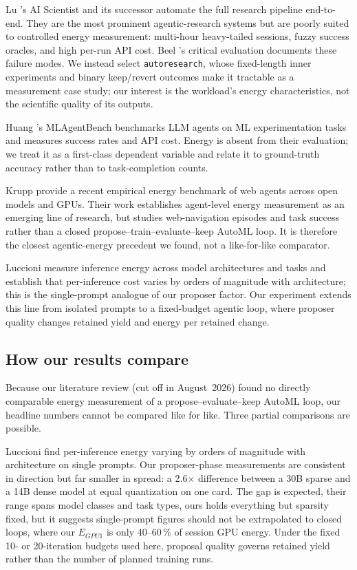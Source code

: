 Lu \etal's AI Scientist \cite{lu2024aiscientist} and its successor \cite{yamada2025aiscientist2} automate the full research pipeline end-to-end. They are the most prominent agentic-research systems but are poorly suited to controlled energy measurement: multi-hour heavy-tailed sessions, fuzzy success oracles, and high per-run API cost. Beel \etal's critical evaluation \cite{beel2025evaluating} documents these failure modes. We instead select \texttt{autoresearch}, whose fixed-length inner experiments and binary keep/revert outcomes make it tractable as a measurement case study; our interest is the workload's energy characteristics, not the scientific quality of its outputs.

Huang \etal's MLAgentBench \cite{huang2024mlagentbench} benchmarks LLM agents on ML experimentation tasks and measures success rates and API cost. Energy is absent from their evaluation; we treat it as a first-class dependent variable and relate it to ground-truth accuracy rather than to task-completion counts.

Krupp \etal \cite{krupp2026webagents} provide a recent empirical energy benchmark of web agents across open models and GPUs. Their work establishes agent-level energy measurement as an emerging line of research, but studies web-navigation episodes and task success rather than a closed propose--train--evaluate--keep AutoML loop. It is therefore the closest agentic-energy precedent we found, not a like-for-like comparator.

Luccioni \etal \cite{luccioni2024power} measure inference energy across model architectures and tasks and establish that per-inference cost varies by orders of magnitude with architecture; this is the single-prompt analogue of our proposer factor. Our experiment extends this line from isolated prompts to a fixed-budget agentic loop, where proposer quality changes retained yield and energy per retained change.

\subsection{How our results compare}

Because our literature review (cut off in August~2026) found no directly
comparable energy measurement of a propose--evaluate--keep AutoML loop, our
headline numbers cannot be compared like for like. Three partial comparisons
are possible.

Luccioni \etal \cite{luccioni2024power} find per-inference energy varying by
orders of magnitude with architecture on single prompts. Our proposer-phase
measurements are consistent in direction but far smaller in spread: a
2.6$\times$ difference between a 30B sparse and a 14B dense model at equal
quantization on one card. The gap is expected, their range spans model classes
and task types, ours holds everything but sparsity fixed, but it suggests
single-prompt figures should not be extrapolated to closed loops, where our
$E_{\mathit{GPU1}}$ is only 40--60\,\% of session GPU energy. Under the fixed
10- or 20-iteration budgets used here, proposal quality governs retained yield
rather than the number of planned training runs.

